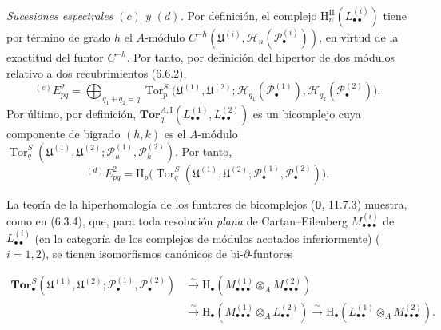 \begin{env}[6.6.5]
\label{III.6.6.5}
\emph{Sucesiones espectrales $(c)$ y $(d)$.} Por definición, el complejo
$\mathrm H_n^{\mathrm{II}}(L_{\bullet\bullet}^{(i)})$ tiene por término de
grado $h$ el $A$-módulo
$C^{-h}(\mathfrak U^{(i)},\mathscr H_n(\mathscr P_\bullet^{(i)}))$, en virtud
de la exactitud del funtor $C^{-h}$. Por tanto, por definición del hipertor de
dos módulos relativo a dos recubrimientos (6.6.2),
\[
  {}^{(c)}E_{pq}^2
  =\bigoplus_{q_1+q_2=q}
   \operatorname{Tor}_p^S
   \bigl(\mathfrak U^{(1)},\mathfrak U^{(2)};
         \mathscr H_{q_1}(\mathscr P_\bullet^{(1)}),
         \mathscr H_{q_2}(\mathscr P_\bullet^{(2)})\bigr).
\]
Por último, por definición,
$\mathbf{Tor}_q^{A,\mathrm I}
(L_{\bullet\bullet}^{(1)},L_{\bullet\bullet}^{(2)})$ es un bicomplejo cuya
componente de bigrado $(h,k)$ es el $A$-módulo
$\operatorname{Tor}_q^S
(\mathfrak U^{(1)},\mathfrak U^{(2)};
 \mathscr P_h^{(1)},\mathscr P_k^{(2)})$. Por tanto,
\[
  {}^{(d)}E_{pq}^2
  =\mathrm H_p\bigl(
    \operatorname{Tor}_q^S
    (\mathfrak U^{(1)},\mathfrak U^{(2)};
     \mathscr P_\bullet^{(1)},\mathscr P_\bullet^{(2)})\bigr).
\]
\end{env}

\begin{env}[6.6.6]
\label{III.6.6.6}
La teoría de la hiperhomología de los funtores de bicomplejos
(\textbf{0}, 11.7.3) muestra, como en (6.3.4), que, para toda resolución
\emph{plana} de Cartan--Eilenberg $M_{\bullet\bullet\bullet}^{(i)}$ de
$L_{\bullet\bullet}^{(i)}$ (en la categoría de los complejos de módulos
acotados inferiormente) ($i=1,2$), se tienen isomorfismos canónicos de
bi-$\partial$-funtores

\label{III.6.6.6.1}
\[
\begin{aligned}
  \mathbf{Tor}_\bullet^S
  (\mathfrak U^{(1)},\mathfrak U^{(2)};
   \mathscr P_\bullet^{(1)},\mathscr P_\bullet^{(2)})
  &\xrightarrow{\sim}
   \mathrm H_\bullet
   (M_{\bullet\bullet\bullet}^{(1)}\otimes_A M_{\bullet\bullet\bullet}^{(2)})\\
  &\xrightarrow{\sim}
   \mathrm H_\bullet
   (M_{\bullet\bullet\bullet}^{(1)}\otimes_A L_{\bullet\bullet}^{(2)})
   \xrightarrow{\sim}
   \mathrm H_\bullet
   (L_{\bullet\bullet}^{(1)}\otimes_A M_{\bullet\bullet\bullet}^{(2)}).
\end{aligned}
\tag{6.6.6.1}\label{III.6.6.6.1.fr}
\]

\end{env}

